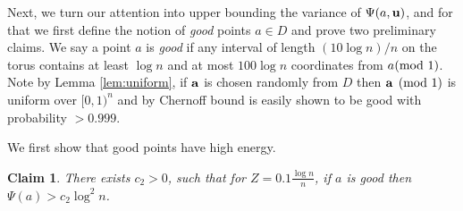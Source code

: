 \documentclass[10pt,a4paper]{article}
\newtheorem{claim}[thm]{Claim}
\begin{document}
Next, we turn our attention into upper bounding the variance of $\Psi(a,{\bf u})$, and
for that we first define the notion of {\em good} points $a\in D$ and prove two preliminary
claims.
We say a point $a$ is {\em good} if any interval of length $(10\log n)/n$
on the torus contains at least $\log n$ and at most $100 \log n$ coordinates from $a\hspace{-1ex}\pmod{1}$.
Note by Lemma \ref{lem:uniform}, if ${\bf a}$ is chosen randomly from $D$ then ${\bf a}\pmod{1}$ is uniform
over $[0,1)^n$ and by Chernoff bound is easily shown to be good with probability $>0.999$.

We first show that good points have high energy.
\begin{claim}\label{cl:6}
There exists $c_2>0$, such that for
$Z = 0.1 \frac{\log n}{n}$, if
$a$ is good then $\Psi(a)> c_2 \log^2 n$.
\end{claim}
\end{document}
